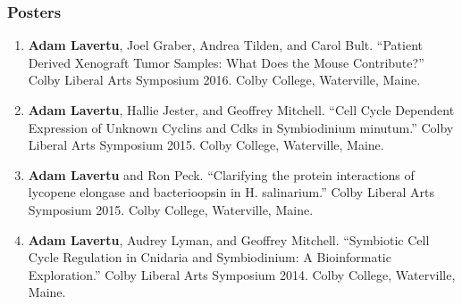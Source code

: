 \documentclass[12pt,]{scrartcl}
\begin{document}
\subsubsection{Posters}\label{posters}

\begin{enumerate}
  \leftskip-0.13in %
  \item \textbf{Adam Lavertu}, Joel Graber, Andrea Tilden, and Carol Bult. “Patient Derived Xenograft Tumor Samples: What Does the Mouse Contribute?” Colby Liberal Arts Symposium 2016. Colby College, Waterville, Maine.\\
  \item \textbf{Adam Lavertu}, Hallie Jester, and Geoffrey Mitchell. “Cell Cycle Dependent Expression of Unknown Cyclins and Cdks in Symbiodinium minutum.” Colby Liberal Arts Symposium 2015. Colby College, Waterville, Maine.\\
  \item \textbf{Adam Lavertu} and Ron Peck. “Clarifying the protein interactions of lycopene elongase and bacterioopsin in H. salinarium.” Colby Liberal Arts Symposium 2015. Colby College, Waterville, Maine.\\
  \item \textbf{Adam Lavertu}, Audrey Lyman, and Geoffrey Mitchell. “Symbiotic Cell Cycle Regulation in Cnidaria and Symbiodinium: A Bioinformatic Exploration.” Colby Liberal Arts Symposium 2014. Colby College, Waterville, Maine.\\

\end{enumerate}

\pagebreak
\end{document}
